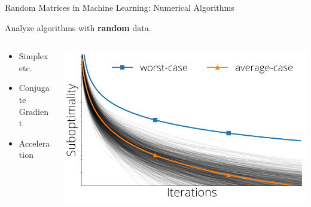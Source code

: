\documentclass[10pt, aspectratio=169]{beamer}
\begin{document}
\begin{frame}{Random Matrices in Machine Learning: Numerical Algorithms}


Analyze algorithms with {\bfseries random}  data.
\begin{columns}
\begin{column}{0.5\linewidth}
\begin{itemize}
    \item Simplex {\footnotesize\citep{Borgwardt1987, Smale1983, Spielman2004, Vershynin2009a} etc}.
    \item Conjugate Gradient {\footnotesize\citep{Deift2017, paquette2020universality}}
    \item Acceleration {\footnotesize\citep{pedregosa2020acceleration, lacotte2020optimal}}
\end{itemize}
\end{column}
\begin{column}{0.5\linewidth}
\begin{center}
\includegraphics[width=0.9\linewidth]{part-1-images/averagecase.png}
\end{center}
\end{column}
\end{columns}
\pause\vspace*{1em}{Topic of Part 3 of this tutorial}
\end{frame}
\end{document}
